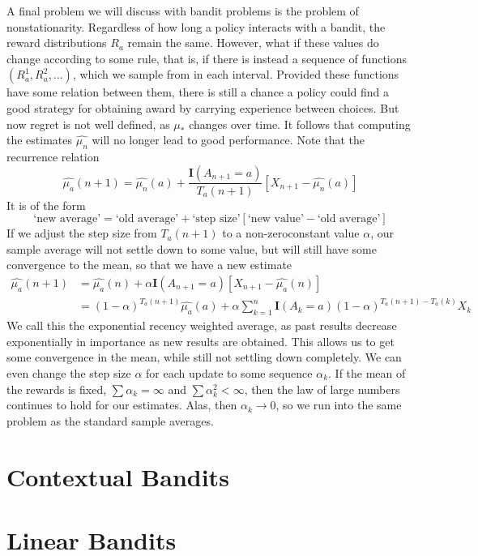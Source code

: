 A final problem we will discuss with bandit problems is the problem of nonstationarity. Regardless of how long a policy interacts with a bandit, the reward distributions $R_a$ remain the same. However, what if these values do change according to some rule, that is, if there is instead a sequence of functions $(R^1_a, R^2_a, \dots)$, which we sample from in each interval. Provided these functions have some relation between them, there is still a chance a policy could find a good strategy for obtaining award by carrying experience between choices. But now regret is not well defined, as $\mu_*$ changes over time. It follows that computing the estimates $\widehat{\mu_n}$ will no longer lead to good performance. Note that the recurrence relation
%
\[ \widehat{\mu_a}(n+1) = \widehat{\mu_n}(a) + \frac{\mathbf{I}(A_{n+1} = a)}{T_a(n+1)} [X_{n+1} - \widehat{\mu_n}(a)] \]
%
It is of the form
%
\[ \text{`new average'} = \text{`old average'} + \text{`step size'}[\text{`new value'} - \text{`old average'}] \]
%
If we adjust the step size from $T_a(n+1)$ to a non-zeroconstant value $\alpha$, our sample average will not settle down to some value, but will still have some convergence to the mean, so that we have a new estimate
%
\begin{align*}
    \widehat{\mu_a}(n+1) &= \widehat{\mu_a}(n) + \alpha \mathbf{I}(A_{n+1} = a) [X_{n+1} - \widehat{\mu_a}(n)]\\
    &= (1 - \alpha)^{T_a(n+1)} \widehat{\mu_a}(a) + \alpha \sum_{k = 1}^n \mathbf{I}(A_k = a) (1 - \alpha)^{T_a(n+1) - T_a(k)} X_k
\end{align*}
%
We call this the exponential recency weighted average, as past results decrease exponentially in importance as new results are obtained. This allows us to get some convergence in the mean, while still not settling down completely. We can even change the step size $\alpha$ for each update to some sequence $\alpha_k$. If the mean of the rewards is fixed, $\sum \alpha_k = \infty$ and $\sum \alpha_k^2 < \infty$, then the law of large numbers continues to hold for our estimates. Alas, then $\alpha_k \to 0$, so we run into the same problem as the standard sample averages.

\chapter{Contextual Bandits}

\chapter{Linear Bandits}

